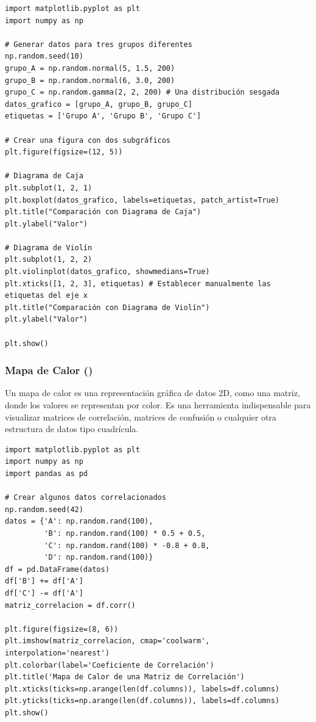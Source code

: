 \begin{example}
\text{ }\begin{verbatim}
import matplotlib.pyplot as plt
import numpy as np

# Generar datos para tres grupos diferentes
np.random.seed(10)
grupo_A = np.random.normal(5, 1.5, 200)
grupo_B = np.random.normal(6, 3.0, 200)
grupo_C = np.random.gamma(2, 2, 200) # Una distribución sesgada
datos_grafico = [grupo_A, grupo_B, grupo_C]
etiquetas = ['Grupo A', 'Grupo B', 'Grupo C']

# Crear una figura con dos subgráficos
plt.figure(figsize=(12, 5))

# Diagrama de Caja
plt.subplot(1, 2, 1)
plt.boxplot(datos_grafico, labels=etiquetas, patch_artist=True)
plt.title("Comparación con Diagrama de Caja")
plt.ylabel("Valor")

# Diagrama de Violín
plt.subplot(1, 2, 2)
plt.violinplot(datos_grafico, showmedians=True)
plt.xticks([1, 2, 3], etiquetas) # Establecer manualmente las etiquetas del eje x
plt.title("Comparación con Diagrama de Violín")
plt.ylabel("Valor")

plt.show()
\end{verbatim}
\end{example}

\subsubsection*{Mapa de Calor ()}
Un mapa de calor es una representación gráfica de datos 2D, como una matriz, donde los valores se representan por color. Es una herramienta indispensable para visualizar matrices de correlación, matrices de confusión o cualquier otra estructura de datos tipo cuadrícula.

\begin{example}
\text{ }\begin{verbatim}
import matplotlib.pyplot as plt
import numpy as np
import pandas as pd

# Crear algunos datos correlacionados
np.random.seed(42)
datos = {'A': np.random.rand(100),
         'B': np.random.rand(100) * 0.5 + 0.5,
         'C': np.random.rand(100) * -0.8 + 0.8,
         'D': np.random.rand(100)}
df = pd.DataFrame(datos)
df['B'] += df['A']
df['C'] -= df['A']
matriz_correlacion = df.corr()

plt.figure(figsize=(8, 6))
plt.imshow(matriz_correlacion, cmap='coolwarm', interpolation='nearest')
plt.colorbar(label='Coeficiente de Correlación')
plt.title('Mapa de Calor de una Matriz de Correlación')
plt.xticks(ticks=np.arange(len(df.columns)), labels=df.columns)
plt.yticks(ticks=np.arange(len(df.columns)), labels=df.columns)
plt.show()
\end{verbatim}
\end{example}

